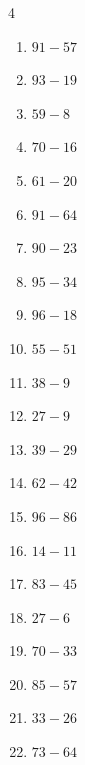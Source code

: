 \begin{multicols}{4}
\begin{enumerate}
  \item $91-57$
        \phantom{$=34$}

  \item $93-19$
        \phantom{$=74$}

  \item $59-8$
        \phantom{$=51$}

  \item $70-16$
        \phantom{$=54$}

  \item $61-20$
        \phantom{$=41$}

\columnbreak %

  \item $91-64$
        \phantom{$=27$}

  \item $90-23$
        \phantom{$=67$}

  \item $95-34$
        \phantom{$=61$}

  \item $96-18$
        \phantom{$=78$}

  \item $55-51$
        \phantom{$=4$}

  \item $38-9$
        \phantom{$=29$}

  \item $27-9$
        \phantom{$=18$}

  \item $39-29$
        \phantom{$=10$}

  \item $62-42$
        \phantom{$=20$}

  \item $96-86$
        \phantom{$=10$}

  \item $14-11$
        \phantom{$=3$}

  \item $83-45$
        \phantom{$=38$}

  \item $27-6$
        \phantom{$=21$}

  \item $70-33$
        \phantom{$=37$}

  \item $85-57$
        \phantom{$=28$}

  \item $33-26$
        \phantom{$=7$}

  \item $73-64$
        \phantom{$=9$}


\end{enumerate}
\end{multicols}
